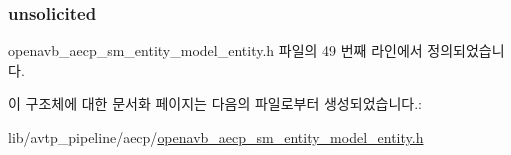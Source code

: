 \subsubsection[{\texorpdfstring{unsolicited}{unsolicited}}]{ unsolicited}\hypertarget{structopenavb__aecp__sm__entity__model__entity__vars__t_a83c75774dc8eae330a023c87e3757127}{}\label{structopenavb__aecp__sm__entity__model__entity__vars__t_a83c75774dc8eae330a023c87e3757127}


openavb\+\_\+aecp\+\_\+sm\+\_\+entity\+\_\+model\+\_\+entity.\+h 파일의 49 번째 라인에서 정의되었습니다.



이 구조체에 대한 문서화 페이지는 다음의 파일로부터 생성되었습니다.\+:\begin{DoxyCompactItemize}
\item 
lib/avtp\+\_\+pipeline/aecp/\hyperlink{openavb__aecp__sm__entity__model__entity_8h}{openavb\+\_\+aecp\+\_\+sm\+\_\+entity\+\_\+model\+\_\+entity.\+h}\end{DoxyCompactItemize}
